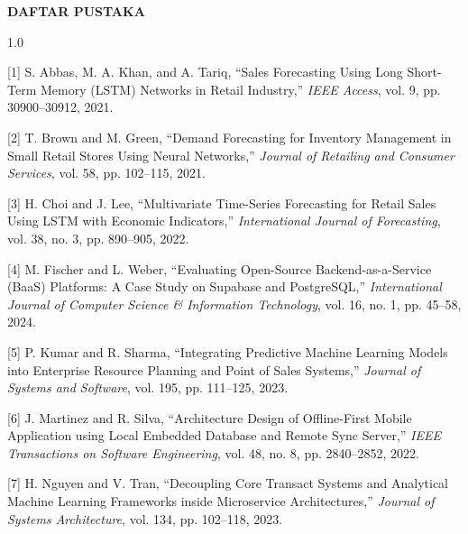 \documentclass[12pt, a4paper, onecolumn, oneside]{report}
\begin{document}
\newpage
\begin{center}
{\large\bfseries DAFTAR PUSTAKA}
\end{center}

\vspace{0.5cm}
\begin{spacing}{1.0}

\noindent\hangindent=1.5cm
{[1]} S. Abbas, M. A. Khan, and A. Tariq, ``Sales Forecasting Using Long Short-Term Memory (LSTM) Networks in Retail Industry,'' \textit{IEEE Access}, vol. 9, pp. 30900--30912, 2021.

\vspace{0.3cm}
\noindent\hangindent=1.5cm
{[2]} T. Brown and M. Green, ``Demand Forecasting for Inventory Management in Small Retail Stores Using Neural Networks,'' \textit{Journal of Retailing and Consumer Services}, vol. 58, pp. 102--115, 2021.

\vspace{0.3cm}
\noindent\hangindent=1.5cm
{[3]} H. Choi and J. Lee, ``Multivariate Time-Series Forecasting for Retail Sales Using LSTM with Economic Indicators,'' \textit{International Journal of Forecasting}, vol. 38, no. 3, pp. 890--905, 2022.

\vspace{0.3cm}
\noindent\hangindent=1.5cm
{[4]} M. Fischer and L. Weber, ``Evaluating Open-Source Backend-as-a-Service (BaaS) Platforms: A Case Study on Supabase and PostgreSQL,'' \textit{International Journal of Computer Science \& Information Technology}, vol. 16, no. 1, pp. 45--58, 2024.

\vspace{0.3cm}
\noindent\hangindent=1.5cm
{[5]} P. Kumar and R. Sharma, ``Integrating Predictive Machine Learning Models into Enterprise Resource Planning and Point of Sales Systems,'' \textit{Journal of Systems and Software}, vol. 195, pp. 111--125, 2023.

\vspace{0.3cm}
\noindent\hangindent=1.5cm
{[6]} J. Martinez and R. Silva, ``Architecture Design of Offline-First Mobile Application using Local Embedded Database and Remote Sync Server,'' \textit{IEEE Transactions on Software Engineering}, vol. 48, no. 8, pp. 2840--2852, 2022.

\vspace{0.3cm}
\noindent\hangindent=1.5cm
{[7]} H. Nguyen and V. Tran, ``Decoupling Core Transact Systems and Analytical Machine Learning Frameworks inside Microservice Architectures,'' \textit{Journal of Systems Architecture}, vol. 134, pp. 102--118, 2023.


\end{spacing}
\end{document}
